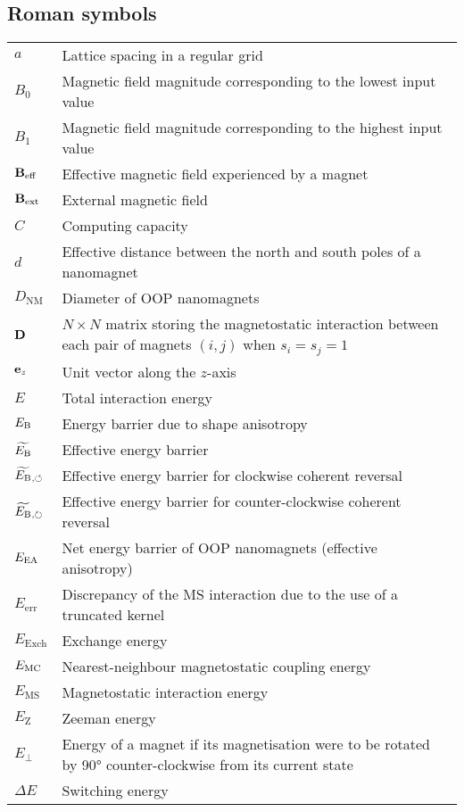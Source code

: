 \subsection*{Roman symbols}
\begin{longtable}[l]{p{60pt} p{350pt}}
	$a$ & Lattice spacing in a regular grid \\[\whiteline]

	$B_0$ & Magnetic field magnitude corresponding to the lowest input value \\
	$B_1$ & Magnetic field magnitude corresponding to the highest input value \\
	$\boldsymbol{\mathbf{B}}_\mathrm{eff}$ & Effective magnetic field experienced by a magnet \\
	$\boldsymbol{\mathbf{B}}_\mathrm{ext}$ & External magnetic field \\[\whiteline]
	
	$C$ & Computing capacity \\[\whiteline]

	$d$ & Effective distance between the north and south poles of a nanomagnet \\
	$D_\mathrm{NM}$ & Diameter of OOP nanomagnets \\
	$\boldsymbol{\mathbf{D}}$ & $N \times N$ matrix storing the magnetostatic interaction between each pair of magnets $(i,j)$ when $s_i=s_j=1$ \\[\whiteline]

	$\boldsymbol{\mathbf{e}}_z$ & Unit vector along the $z$-axis \\
	$E$ & Total interaction energy \\
	$E_\mathrm{B}$ & Energy barrier due to shape anisotropy \\
	$\widetilde{E_\mathrm{B}}$ & Effective energy barrier \\
	$\widetilde{E_\mathrm{B}}{}_{,\circlearrowleft}$ & Effective energy barrier for clockwise coherent reversal \\
	$\widetilde{E_\mathrm{B}}{}_{,\circlearrowright}$ & Effective energy barrier for counter-clockwise coherent reversal \\
	$E_\mathrm{EA}$ & Net energy barrier of OOP nanomagnets (effective anisotropy) \\
	$E_\mathrm{err}$ & Discrepancy of the MS interaction due to the use of a truncated kernel \\
	$E_\mathrm{Exch}$ & Exchange energy\\
	$E_\mathrm{MC}$ & Nearest-neighbour magnetostatic coupling energy \\
	$E_\mathrm{MS}$ & Magnetostatic interaction energy \\
	$E_\mathrm{Z}$ & Zeeman energy\\
	$E_\perp$ & Energy of a magnet if its magnetisation were to be rotated by \ang{90} counter-clockwise from its current state \\
	$\Delta E$ & Switching energy \\[\whiteline]
	

\end{longtable}
